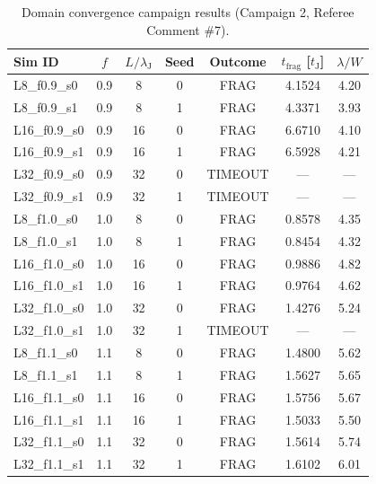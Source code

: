 \begin{table}
\centering
\caption{Domain convergence campaign results (Campaign 2, Referee Comment \#7).}
\label{tab:domain_convergence}
\begin{tabular}{lcccccc}
\hline\hline
Sim ID & $f$ & $L/\lambda_\mathrm{J}$ & Seed & Outcome & $t_\mathrm{frag}$ [$t_\mathrm{J}$] & $\lambda/W$ \\
\hline
L8\_f0.9\_s0 & 0.9 & 8 & 0 & FRAG & 4.1524 & 4.20 \\
L8\_f0.9\_s1 & 0.9 & 8 & 1 & FRAG & 4.3371 & 3.93 \\
L16\_f0.9\_s0 & 0.9 & 16 & 0 & FRAG & 6.6710 & 4.10 \\
L16\_f0.9\_s1 & 0.9 & 16 & 1 & FRAG & 6.5928 & 4.21 \\
L32\_f0.9\_s0 & 0.9 & 32 & 0 & TIMEOUT & --- & --- \\
L32\_f0.9\_s1 & 0.9 & 32 & 1 & TIMEOUT & --- & --- \\
L8\_f1.0\_s0 & 1.0 & 8 & 0 & FRAG & 0.8578 & 4.35 \\
L8\_f1.0\_s1 & 1.0 & 8 & 1 & FRAG & 0.8454 & 4.32 \\
L16\_f1.0\_s0 & 1.0 & 16 & 0 & FRAG & 0.9886 & 4.82 \\
L16\_f1.0\_s1 & 1.0 & 16 & 1 & FRAG & 0.9764 & 4.62 \\
L32\_f1.0\_s0 & 1.0 & 32 & 0 & FRAG & 1.4276 & 5.24 \\
L32\_f1.0\_s1 & 1.0 & 32 & 1 & TIMEOUT & --- & --- \\
L8\_f1.1\_s0 & 1.1 & 8 & 0 & FRAG & 1.4800 & 5.62 \\
L8\_f1.1\_s1 & 1.1 & 8 & 1 & FRAG & 1.5627 & 5.65 \\
L16\_f1.1\_s0 & 1.1 & 16 & 0 & FRAG & 1.5756 & 5.67 \\
L16\_f1.1\_s1 & 1.1 & 16 & 1 & FRAG & 1.5033 & 5.50 \\
L32\_f1.1\_s0 & 1.1 & 32 & 0 & FRAG & 1.5614 & 5.74 \\
L32\_f1.1\_s1 & 1.1 & 32 & 1 & FRAG & 1.6102 & 6.01 \\
\hline
\end{tabular}
\end{table}
